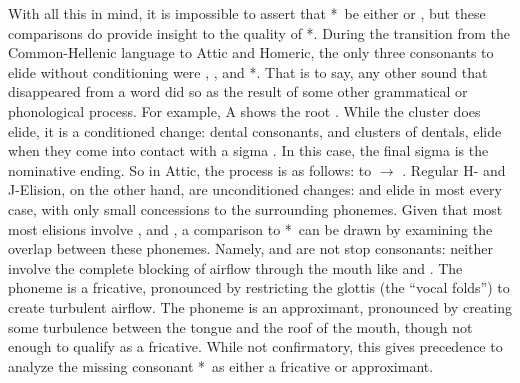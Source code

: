  With all this in mind, it is impossible to assert that *\w\ be either  or , but these comparisons do provide insight to the quality of *\w. During the transition from the Common-Hellenic language to Attic and Homeric, the only three consonants to elide without conditioning were , , and *\w. That is to say, any other sound that disappeared from a word did so as the result of some other grammatical or phonological process. For example, A  shows the root . While the cluster  does elide, it is a conditioned change: dental consonants, and clusters of dentals, elide when they come into contact with a sigma . In this case, the final sigma  is the nominative ending.  So in Attic, the process is as follows:  to  $\to$ . Regular H- and J-Elision, on the other hand, are unconditioned changes:  and  elide in most every case, with only small concessions to the surrounding phonemes. Given that most most elisions involve , and , a comparison to *\w\ can be drawn by examining the overlap between these phonemes. Namely,  and  are not stop consonants: neither involve the complete blocking of airflow through the mouth like  and . The phoneme  is a fricative, pronounced by restricting the glottis (the ``vocal folds'') to create turbulent airflow. The phoneme  is an approximant, pronounced by creating some turbulence between the tongue and the roof of the mouth, though not enough to qualify as a fricative. While not confirmatory, this gives precedence to analyze the missing consonant *\w\ as either a fricative or approximant.

